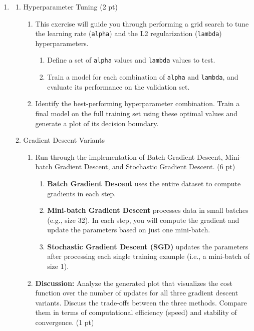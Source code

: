 \documentclass{article}
\theoremstyle{definition}
\theoremstyle{remark}
\newenvironment{Q}
        {%
          \clearpage
          \item
        }
        {%
          \phantom{s} %
          \bigskip
        }
\begin{document}
\begin{enumerate}[font={\Large\bfseries},left=0pt]
\begin{Q}
\begin{enumerate}
{\begin{enumerate}
			      \end{enumerate}
			      }
			\item{Hyperparameter Tuning (2 pt)
			      \begin{enumerate}
				      \item This exercise will guide you through performing a grid search to tune the learning rate (\texttt{alpha}) and the L2 regularization (\texttt{lambda}) hyperparameters.
				            \begin{enumerate}
					            \item Define a set of \texttt{alpha} values and \texttt{lambda} values to test.
					            \item Train a model for each combination of \texttt{alpha} and \texttt{lambda}, and evaluate its performance on the validation set.
				            \end{enumerate}
				      \item Identify the best-performing hyperparameter combination. Train a final model on the full training set using these optimal values and generate a plot of its decision boundary.
			      \end{enumerate}
			      }
			\item{Gradient Descent Variants
			      \begin{enumerate}
				      \item Run through the implementation of Batch Gradient Descent, Mini-batch Gradient Descent, and Stochastic Gradient Descent. (6 pt)
				            \begin{enumerate}
					            \item \textbf{Batch Gradient Descent} uses the entire dataset to compute gradients in each step.
					            \item \textbf{Mini-batch Gradient Descent} processes data in small batches (e.g., size 32). In each step, you will compute the gradient and update the parameters based on just one mini-batch.
					            \item \textbf{Stochastic Gradient Descent (SGD)} updates the parameters after processing each single training example (i.e., a mini-batch of size 1).
				            \end{enumerate}
				      \item \textbf{Discussion:} Analyze the generated plot that visualizes the cost function over the number of updates for all three gradient descent variants. Discuss the trade-offs between the three methods. Compare them in terms of computational efficiency (speed) and stability of convergence. (1 pt)

\end{enumerate}}
\end{enumerate}
\end{Q}
\end{enumerate}
\end{document}
